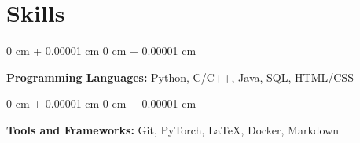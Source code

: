 \documentclass[10pt, letterpaper]{article}
\newenvironment{onecolentry}{
    \begin{adjustwidth}{
        0 cm + 0.00001 cm
    }{
        0 cm + 0.00001 cm
    }
}{
    \end{adjustwidth}
} %
\begin{document}
    \section{Skills}
        
        \begin{onecolentry}
            \textbf{Programming Languages:} Python, C/C++, Java, SQL, HTML/CSS
        \end{onecolentry}

        \vspace{0.10 cm}

        \begin{onecolentry}
            \textbf{Tools and Frameworks:} Git, PyTorch, LaTeX, Docker, Markdown
        \end{onecolentry}
        
    
\end{document}
